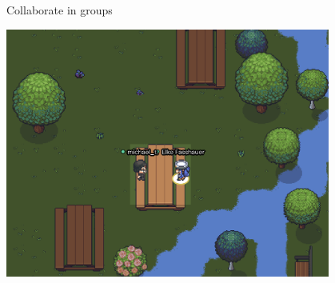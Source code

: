 \begin{frame}{Collaborate in groups}

\begin{center}
 \includegraphics[width=0.8\textwidth]{pics/sit_middle_desk.png}
\end{center}

\end{frame}
